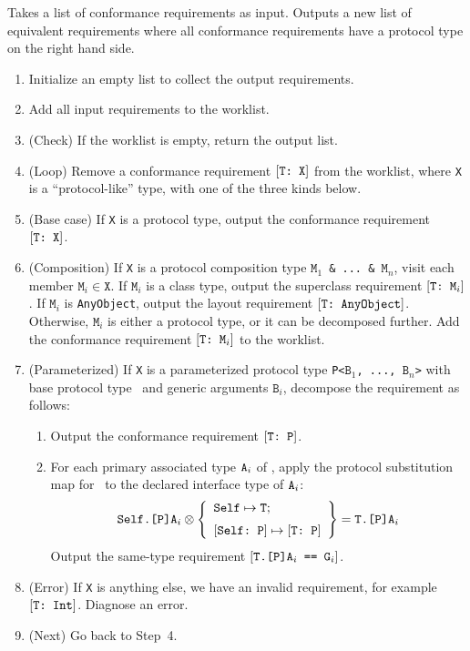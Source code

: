 \documentclass[../generics]{subfiles}
\begin{document}
\begin{algorithm}\label{expand conformance req algorithm} Takes a list of conformance requirements as input. Outputs a new list of equivalent requirements where all conformance requirements have a protocol type on the right hand side.
\begin{enumerate}
\item Initialize an empty list to collect the output requirements.
\item Add all input requirements to the worklist.
\item (Check) If the worklist is empty, return the output list.
\item (Loop) Remove a conformance requirement $[\texttt{T:~X}]$ from the worklist, where \texttt{X} is a ``protocol-like'' type, with one of the three kinds below.
\item (Base case) If \texttt{X} is a protocol type, output the conformance requirement $[\texttt{T:~X}]$.
\item (Composition) If \texttt{X} is a protocol composition type \texttt{$\texttt{M}_1$ \& ...~\& $\texttt{M}_n$}, visit each member $\texttt{M}_i\in\texttt{X}$. If $\texttt{M}_i$ is a class type, output the superclass requirement $[\texttt{T:~$\texttt{M}_i$}]$. If $\texttt{M}_i$ is \texttt{AnyObject}, output the layout requirement $[\texttt{T:~AnyObject}]$. Otherwise, $\texttt{M}_i$ is either a protocol type, or it can be decomposed further. Add the conformance requirement $[\texttt{T:~$\texttt{M}_i$}]$ to the worklist.
\item (Parameterized) If \texttt{X} is a parameterized protocol type \texttt{P<$\texttt{B}_1$, ..., $\texttt{B}_n$>} with base protocol type \tP\ and generic arguments $\texttt{B}_i$, decompose the requirement as follows:
\begin{enumerate}
\item Output the conformance requirement $[\texttt{T:~P}]$.
\item For each primary associated type $\texttt{A}_i$ of \tP, apply the protocol substitution map for \tT\ to the declared interface type of $\texttt{A}_i$:
\[\texttt{Self.[P]A}_i \otimes \SubstMapLongC{\SubstType{Self}{T}}{\SubstConf{Self}{T}{P}} = \texttt{T.[P]A}_i\]
Output the same-type requirement $[\texttt{$\texttt{T.[P]A}_i$ == $\texttt{G}_i$}]$.
\end{enumerate}
\item (Error) If \texttt{X} is anything else, we have an invalid requirement, for example $[\texttt{T:~Int}]$. Diagnose an error.
\item (Next) Go back to Step~4.
\end{enumerate}
\end{algorithm}
\end{document}
